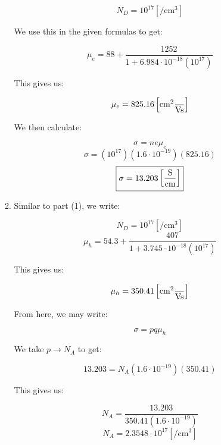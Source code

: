 \begin{enumerate}
\begin{enumerate}[label=\alph*]
        $$N_D=10^{17}[\si{\per\centi\meter\cubed}]$$

        We use this in the given formulas to get:

        $$\mu_e=88+\frac{1252}{1+6.984\cdot10^{-18}(10^{17})}$$

        This gives us:

        $$\mu_e=825.16\left[\si{\centi\meter\squared\over\volt\second}\right]$$

        We then calculate:

        $$\sigma=ne\mu_e$$
        $$\sigma=(10^{17})(1.6\cdot10^{-19})(825.16)$$
        $$\boxed{\sigma=13.203\left[ \si{\siemens\over\centi\meter} \right]}$$

      \item Similar to part (1), we write:

        $$N_D=10^{17}[\si{\per\centi\meter\cubed}]$$
        $$\mu_h=54.3+\frac{407}{1+3.745\cdot10^{-18}(10^{17})}$$

        This gives us:

        $$\mu_h=350.41\left[\si{\centi\meter\squared\over\volt\second}\right]$$

        From here, we may write:

        $$\sigma=pq\mu_h$$

        We take $p\to N_A$ to get:

        $$13.203=N_A(1.6\cdot10^{-19})(350.41)$$

        This gives us:

        $$N_A=\frac{13.203}{350.41(1.6\cdot10^{-19})}$$
        $$\boxed{N_A=2.3548\cdot10^{17}[\si{\per\centi\meter\cubed}]}$$

    \end{enumerate}

\end{enumerate}



